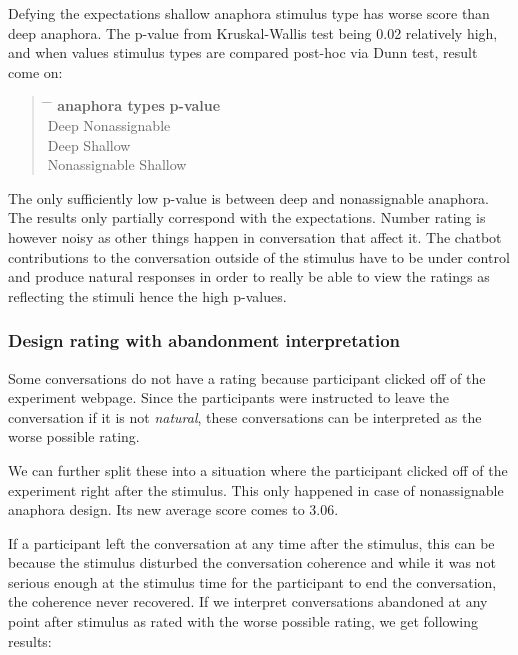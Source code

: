 Defying the expectations shallow anaphora stimulus type has worse score than deep anaphora.
The p-value from Kruskal-Wallis test being 0.02 relatively high, and
when values stimulus types are compared post-hoc via Dunn test,
result come on:

\begin{quote}
\begin{tabbing}
\hspace{4cm} \= \hspace{4cm} \= \kill %
\textbf{anaphora types} \> \> \textbf{p-value} \\
Deep \> Nonassignable  \\
Deep \> Shallow  \\
Nonassignable \> Shallow  \\
\end{tabbing}
\end{quote}

The only sufficiently low p-value is between deep and nonassignable anaphora.
The results only partially correspond with the expectations.
Number rating is however noisy as other things happen in conversation that affect it.
The chatbot contributions to the conversation outside of the stimulus
have to be under control and produce natural responses in order to really be able
to view the ratings as reflecting the stimuli
hence the high p-values.

\subsubsection{Design rating with abandonment interpretation}

Some conversations do not have a rating because participant clicked off of the experiment webpage.
Since the participants were instructed to leave the conversation if it is not \textit{natural},
these conversations can be interpreted as the worse possible rating.

We can further split these into a situation where
the participant clicked off of the experiment
right after the stimulus.
This only happened in case of nonassignable anaphora design.
Its new average score comes to 3.06.

If a participant left the conversation at any time after the stimulus,
this can be because the stimulus disturbed the conversation coherence
and while it was not serious enough at the stimulus time for the participant
to end the conversation,
the coherence never recovered.
If we interpret conversations abandoned at any point after stimulus as rated with the worse possible rating,
we get following results:

